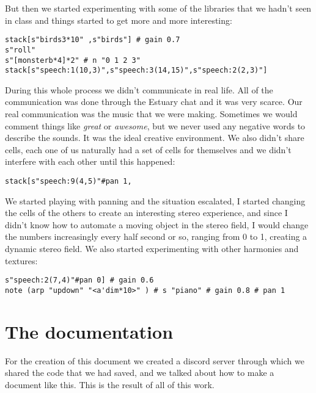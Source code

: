 \documentclass{article}
\begin{document}
But then we started experimenting with some of the libraries that we hadn't seen in class and things started to get more and more interesting:

\begin{verbatim}
stack[s"birds3*10" ,s"birds"] # gain 0.7
s"roll"
s"[monsterb*4]*2" # n "0 1 2 3"
stack[s"speech:1(10,3)",s"speech:3(14,15)",s"speech:2(2,3)"]
\end{verbatim}

During this whole process we didn't communicate in real life. All of the communication was done through the Estuary chat and it was very scarce. Our real communication was the music that we were making. Sometimes we would comment things like \textit{great} or \textit{awesome}, but we never used any negative words to describe the sounds. It was the ideal creative environment. We also didn't share cells, each one of us naturally had a set of cells for themselves and we didn't interfere with each other until this happened:

\begin{verbatim}
stack[s"speech:9(4,5)"#pan 1, 
\end{verbatim}

We started playing with panning and the situation escalated, I started changing the cells of the others to create an interesting stereo experience, and since I didn't know how to automate a moving object in the stereo field, I would change the numbers increasingly every half second or so, ranging from 0 to 1, creating a dynamic stereo field. We also started experimenting with other harmonies and textures:

\begin{verbatim}
s"speech:2(7,4)"#pan 0] # gain 0.6
note (arp "updown" "<a'dim*10>" ) # s "piano" # gain 0.8 # pan 1
\end{verbatim}

\section{The documentation}

For the creation of this document we created a discord server through which we shared the code that we had saved, and we talked about how to make a document like this. This is the result of all of this work.
\end{document}
